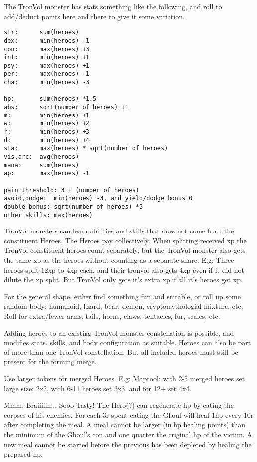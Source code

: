 The TronVol monster has stats something like the following, and roll to add/deduct points here and there to give it some variation.
\small\begin{verbatim}
str:      sum(heroes)
dex:      min(heroes) -1
con:      max(heroes) +3
int:      min(heroes) +1
psy:      max(heroes) +1
per:      max(heroes) -1
cha:      min(heroes) -3

hp:       sum(heroes) *1.5
abs:      sqrt(number of heroes) +1
m:        min(heroes) +1
w:        min(heroes) +2
r:        min(heroes) +3
d:        min(heroes) +4
sta:      max(heroes) * sqrt(number of heroes)
vis,arc:  avg(heroes)
mana:     sum(heroes)
ap:       max(heroes) -1

pain threshold: 3 + (number of heroes)
avoid,dodge:  min(heroes) -3, and yield/dodge bonus 0
double bonus: sqrt(number of heroes) *3
other skills: max(heroes)
\end{verbatim}\normalsize

TronVol monsters can learn abilities and skills that does not come from the constituent Heroes. The Heroes pay collectively. When splitting received xp the TronVol constituent heroes count separately, but the TronVol monster also gets the same xp as the heroes without counting as a separate share. E.g: Three heroes split 12xp to 4xp each, and their tronvol also gets 4xp even if it did not dilute the xp split. But TronVol only gets it's extra xp if all it's heroes get xp.

For the general shape, either find something fun and suitable, or roll up some random body: humanoid, lizard, bear, demon, cryptomythologial mixture, etc. Roll for extra/fewer arms, tails, horns, claws, tentacles, fur, scales, etc.

Adding heroes to an existing TronVol monster constellation is possible, and modifies stats, skills, and body configuration as suitable. Heroes can also be part of more than one TronVol constellation. But all included heroes must still be present for the forming merge.

Use larger tokens for merged Heroes. E.g: Maptool: with 2-5 merged heroes set large size: 2x2, with 6-11 heroes set 3x3, and for 12+ set 4x4.


 Mmm, Braiiiiin... Sooo Tasty!
The Hero(?) can regenerate hp by eating the corpses of his enemies. For each 3r spent eating the Ghoul will heal 1hp every 10r after completing the meal. A meal cannot be larger (in hp healing points) than the minimum of the Ghoul's con and one quarter the original hp of the victim. A new meal cannot be started before the previous has been depleted by healing the prepared hp.

